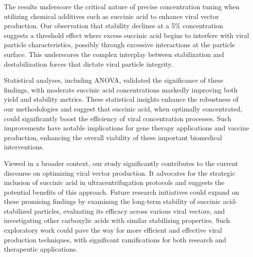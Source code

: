\documentclass{article}
\begin{document}
The results underscore the critical nature of precise concentration tuning when utilizing chemical additives such as succinic acid to enhance viral vector production. Our observation that stability declines at a 5\% concentration suggests a threshold effect where excess succinic acid begins to interfere with viral particle characteristics, possibly through excessive interactions at the particle surface. This underscores the complex interplay between stabilization and destabilization forces that dictate viral particle integrity.

Statistical analyses, including ANOVA, validated the significance of these findings, with moderate succinic acid concentrations markedly improving both yield and stability metrics. These statistical insights enhance the robustness of our methodologies and suggest that succinic acid, when optimally concentrated, could significantly boost the efficiency of viral concentration processes. Such improvements have notable implications for gene therapy applications and vaccine production, enhancing the overall viability of these important biomedical interventions.

Viewed in a broader context, our study significantly contributes to the current discourse on optimizing viral vector production. It advocates for the strategic inclusion of succinic acid in ultracentrifugation protocols and suggests the potential benefits of this approach. Future research initiatives could expand on these promising findings by examining the long-term stability of succinic acid-stabilized particles, evaluating its efficacy across various viral vectors, and investigating other carboxylic acids with similar stabilizing properties. Such exploratory work could pave the way for more efficient and effective viral production techniques, with significant ramifications for both research and therapeutic applications.
\end{document}
